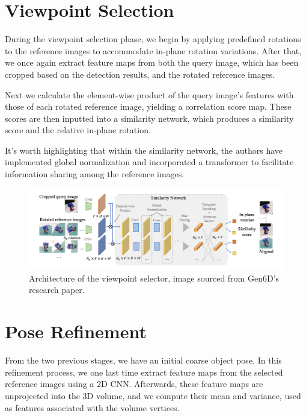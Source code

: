 \section{Viewpoint Selection}

During the viewpoint selection phase, we begin by applying predefined rotations to the reference images to accommodate in-plane rotation variations. After that, we once again extract feature maps from both the query image, which has been cropped based on the detection results, and the rotated reference images.

Next we calculate the element-wise product of the query image's features with those of each rotated reference image, yielding a correlation score map. These scores are then inputted into a similarity network, which produces a similarity score and the relative in-plane rotation.

It's worth highlighting that within the similarity network, the authors have implemented global normalization and incorporated a transformer to facilitate information sharing among the reference images.

\begin{figure}[ht]
  \centering
  \includegraphics[width=\textwidth]{data/gen6d3.png}
  \caption{Architecture of the viewpoint selector, image sourced from Gen6D's \\ research paper.}
  \label{fig:fig2}
\end{figure}

\section{Pose Refinement}

From the two previous stages, we have an initial coarse object pose. 
In this refinement process, we one last time extract feature maps from the selected reference images using a 2D \ac{CNN}. Afterwards, these feature maps are unprojected into the 3D volume, and we compute their mean and variance, used as features associated with the volume vertices.

